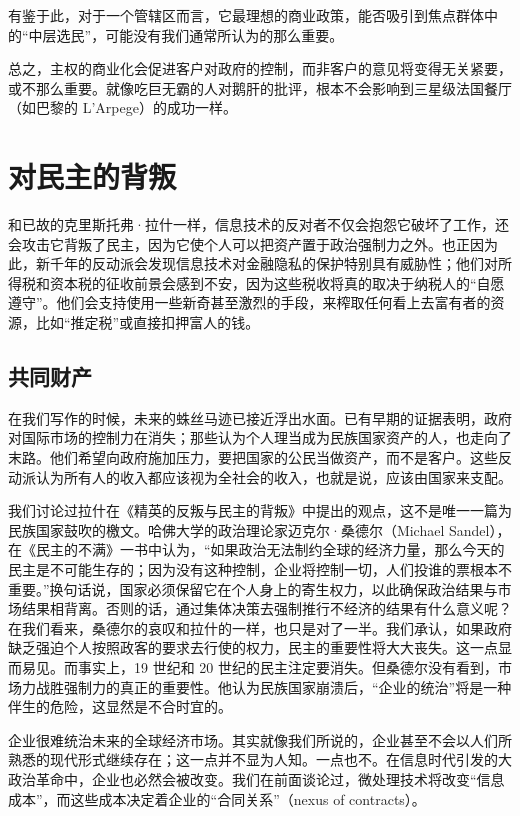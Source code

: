有鉴于此，对于一个管辖区而言，它最理想的商业政策，能否吸引到焦点群体中的“中层选民”，可能没有我们通常所认为的那么重要。

总之，主权的商业化会促进客户对政府的控制，而非客户的意见将变得无关紧要，或不那么重要。就像吃巨无霸的人对鹅肝的批评，根本不会影响到三星级法国餐厅（如巴黎的 L'Arpege）的成功一样。

\section{对民主的背叛}
和已故的克里斯托弗·拉什一样，信息技术的反对者不仅会抱怨它破坏了工作，还会攻击它背叛了民主，因为它使个人可以把资产置于政治强制力之外。也正因为此，新千年的反动派会发现信息技术对金融隐私的保护特别具有威胁性；他们对所得税和资本税的征收前景会感到不安，因为这些税收将真的取决于纳税人的“自愿遵守”。他们会支持使用一些新奇甚至激烈的手段，来榨取任何看上去富有者的资源，比如“推定税”或直接扣押富人的钱。

\subsection{共同财产}
在我们写作的时候，未来的蛛丝马迹已接近浮出水面。已有早期的证据表明，政府对国际市场的控制力在消失；那些认为个人理当成为民族国家资产的人，也走向了末路。他们希望向政府施加压力，要把国家的公民当做资产，而不是客户。这些反动派认为所有人的收入都应该视为全社会的收入，也就是说，应该由国家来支配。

我们讨论过拉什在《精英的反叛与民主的背叛》中提出的观点，这不是唯一一篇为民族国家鼓吹的檄文。哈佛大学的政治理论家迈克尔·桑德尔（Michael Sandel），在《民主的不满》一书中认为，“如果政治无法制约全球的经济力量，那么今天的民主是不可能生存的；因为没有这种控制，企业将控制一切，人们投谁的票根本不重要。”换句话说，国家必须保留它在个人身上的寄生权力，以此确保政治结果与市场结果相背离。否则的话，通过集体决策去强制推行不经济的结果有什么意义呢？在我们看来，桑德尔的哀叹和拉什的一样，也只是对了一半。我们承认，如果政府缺乏强迫个人按照政客的要求去行使的权力，民主的重要性将大大丧失。这一点显而易见。而事实上，19 世纪和 20 世纪的民主注定要消失。但桑德尔没有看到，市场力战胜强制力的真正的重要性。他认为民族国家崩溃后，“企业的统治”将是一种伴生的危险，这显然是不合时宜的。

企业很难统治未来的全球经济市场。其实就像我们所说的，企业甚至不会以人们所熟悉的现代形式继续存在；这一点并不显为人知。一点也不。在信息时代引发的大政治革命中，企业也必然会被改变。我们在前面谈论过，微处理技术将改变“信息成本”，而这些成本决定着企业的“合同关系”（nexus of contracts）。

